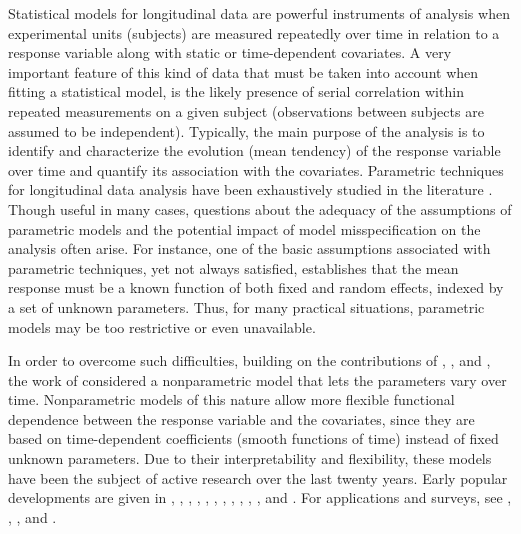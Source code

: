\documentclass[letterpaper,10pt,openany]{article}
\begin{document}
Statistical models for longitudinal data are powerful instruments of analysis when experimental units (subjects) are measured repeatedly over time in relation to a response variable along with static or time-dependent covariates. A very important feature of this kind of data that must be taken into account when fitting a statistical model, is the likely presence of serial correlation within repeated measurements on a given subject (observations between subjects are assumed to be independent). Typically, the main purpose of the analysis is to identify and characterize the evolution (mean tendency) of the response variable over time and quantify its association with the covariates. Parametric techniques for longitudinal data analysis have been exhaustively studied in the literature \citep[see for example][and references within] {molenberghs-2014, liu-2015, little-2015}. Though useful in many cases, questions about the adequacy of the assumptions of parametric models and the potential impact of model misspecification on the analysis often arise. For instance, one of the basic assumptions associated with parametric techniques, yet not always satisfied, establishes that the mean response must be a known function of both fixed and random effects, indexed by a set of unknown parameters. Thus, for many practical situations, parametric models may be too restrictive or even unavailable. 


In order to overcome such difficulties, building on the contributions of \cite{cleveland-1991}, \cite{hastie-tibshirani-1993}, and \cite{zeger-diggle-94}, the work of \cite{hoover-rice-wu-yang-98} considered a nonparametric model that lets the parameters vary over time. Nonparametric models of this nature allow more flexible functional dependence between the response variable and the covariates, since they are based on time-dependent coefficients (smooth functions of time) instead of fixed unknown parameters. Due to their interpretability and flexibility, these models have been the subject of active research over the last twenty years. 
{\color{black} Early popular developments are given in \cite{wu-1998-asymptotic}, \cite{zhang-1998-semiparametric}, \cite{fan-zhang-1999-statistical}, \cite{wu-2000-kernel}, \cite{cai-2000-efficient}, \cite{fan-2000-two}, \cite{lin-2000-nonparametric}, \cite{lin-2001-semiparametric}, \cite{chiang-2001-smoothing}, \cite{rice-2001-nonparametric}, \cite{wu-2002-local}, and \cite{huang-2002-varying}. For applications and surveys, see \cite{fan-2008-statistical}, \cite{tan2012time}, \cite{zhang-2013}, and \cite{wu-tian-2018}.}
\end{document}
